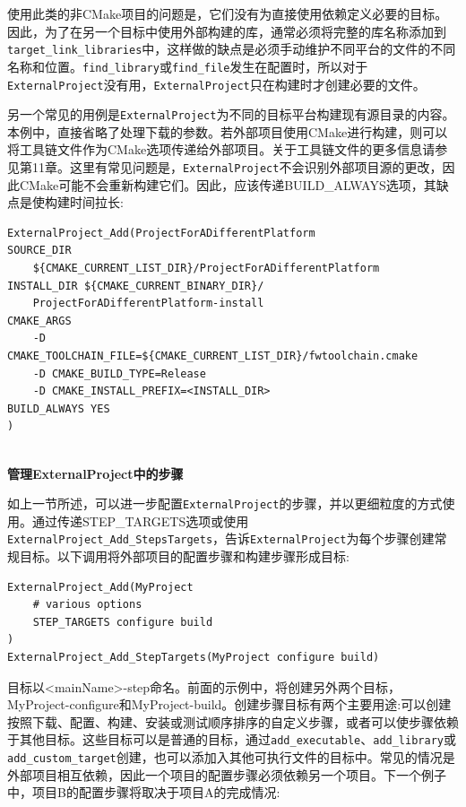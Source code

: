 使用此类的非CMake项目的问题是，它们没有为直接使用依赖定义必要的目标。因此，为了在另一个目标中使用外部构建的库，通常必须将完整的库名称添加到\texttt{target\_link\_libraries}中，这样做的缺点是必须手动维护不同平台的文件的不同名称和位置。\texttt{find\_library}或\texttt{find\_file}发生在配置时，所以对于\texttt{ExternalProject}没有用，\texttt{ExternalProject}只在构建时才创建必要的文件。

另一个常见的用例是\texttt{ExternalProject}为不同的目标平台构建现有源目录的内容。本例中，直接省略了处理下载的参数。若外部项目使用CMake进行构建，则可以将工具链文件作为CMake选项传递给外部项目。关于工具链文件的更多信息请参见第11章。这里有常见问题是，\texttt{ExternalProject}不会识别外部项目源的更改，因此CMake可能不会重新构建它们。因此，应该传递BUILD\_ALWAYS选项，其缺点是使构建时间拉长:

\begin{lstlisting}[style=styleCMake]
ExternalProject_Add(ProjectForADifferentPlatform
SOURCE_DIR 
	${CMAKE_CURRENT_LIST_DIR}/ProjectForADifferentPlatform
INSTALL_DIR ${CMAKE_CURRENT_BINARY_DIR}/
	ProjectForADifferentPlatform-install
CMAKE_ARGS
	-D CMAKE_TOOLCHAIN_FILE=${CMAKE_CURRENT_LIST_DIR}/fwtoolchain.cmake
	-D CMAKE_BUILD_TYPE=Release
	-D CMAKE_INSTALL_PREFIX=<INSTALL_DIR>
BUILD_ALWAYS YES
)
\end{lstlisting}

\hspace*{\fill} \\ %
\noindent
\textbf{管理ExternalProject中的步骤}

如上一节所述，可以进一步配置\texttt{ExternalProject}的步骤，并以更细粒度的方式使用。通过传递STEP\_TARGETS选项或使用\texttt{ExternalProject\_Add\_StepsTargets}，告诉\texttt{ExternalProject}为每个步骤创建常规目标。以下调用将外部项目的配置步骤和构建步骤形成目标:

\begin{lstlisting}[style=styleCMake]
ExternalProject_Add(MyProject
	# various options
	STEP_TARGETS configure build
)
ExternalProject_Add_StepTargets(MyProject configure build)
\end{lstlisting}

目标以<mainName>-step命名。前面的示例中，将创建另外两个目标，MyProject-configure和MyProject-build。创建步骤目标有两个主要用途:可以创建按照下载、配置、构建、安装或测试顺序排序的自定义步骤，或者可以使步骤依赖于其他目标。这些目标可以是普通的目标，通过\texttt{add\_executable}、\texttt{add\_library}或\texttt{add\_custom\_target}创建，也可以添加入其他可执行文件的目标中。常见的情况是外部项目相互依赖，因此一个项目的配置步骤必须依赖另一个项目。下一个例子中，项目B的配置步骤将取决于项目A的完成情况:
 
